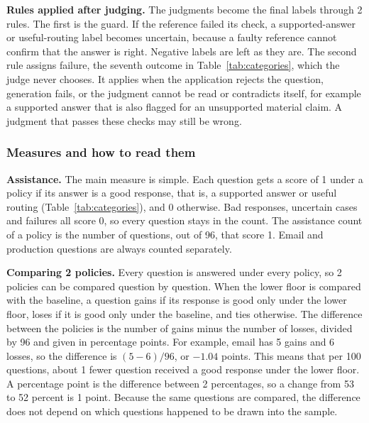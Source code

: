 

\textbf{Rules applied after judging.} The judgments become the final labels through 2 rules. The first is the guard. If the reference failed its check, a supported-answer or useful-routing label becomes uncertain, because a faulty reference cannot confirm that the answer is right. Negative labels are left as they are. The second rule assigns failure, the seventh outcome in Table~\ref{tab:categories}, which the judge never chooses. It applies when the application rejects the question, generation fails, or the judgment cannot be read or contradicts itself, for example a supported answer that is also flagged for an unsupported material claim. A judgment that passes these checks may still be wrong.

\subsubsection{Measures and how to read them}
\label{sec:read-results}

\textbf{Assistance.} The main measure is simple. Each question gets a score of 1 under a policy if its answer is a good response, that is, a supported answer or useful routing (Table~\ref{tab:categories}), and 0 otherwise. Bad responses, uncertain cases and failures all score 0, so every question stays in the count. The assistance count of a policy is the number of questions, out of 96, that score 1. Email and production questions are always counted separately.

\textbf{Comparing 2 policies.} Every question is answered under every policy, so 2 policies can be compared question by question. When the lower floor is compared with the baseline, a question gains if its response is good only under the lower floor, loses if it is good only under the baseline, and ties otherwise. The difference between the policies is the number of gains minus the number of losses, divided by 96 and given in percentage points. For example, email has 5 gains and 6 losses, so the difference is $(5-6)/96$, or $-1.04$ points. This means that per 100 questions, about 1 fewer question received a good response under the lower floor. A percentage point is the difference between 2 percentages, so a change from 53 to 52 percent is 1 point. Because the same questions are compared, the difference does not depend on which questions happened to be drawn into the sample.

